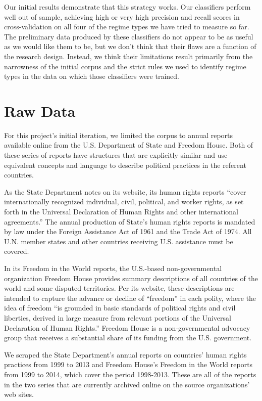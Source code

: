 \documentclass[pdftex,12pt,fullpage,oneside]{amsart}
\begin{document}
Our initial results demonstrate that this strategy works. Our classifiers perform well out of sample, achieving high or very high precision and recall scores in cross-validation on all four of the regime types we have tried to measure so far. The preliminary data produced by these classifiers do not appear to be as useful as we would like them to be, but we don't think that their flaws are a function of the research design. Instead, we think their limitations result primarily from the narrowness of the initial corpus and the strict rules we used to identify regime types in the data on which those classifiers were trained.

\section{Raw Data}

For this project's initial iteration, we limited the corpus to annual reports available online from the U.S. Department of State and Freedom House. Both of these series of reports have structures that are explicitly similar and use equivalent concepts and language to describe political practices in the referent countries.

As the State Department notes on its website, its human rights reports ``cover internationally recognized individual, civil, political, and worker rights, as set forth in the Universal Declaration of Human Rights and other international agreements.'' The annual production of State's human rights reports is mandated by law under the Foreign Assistance Act of 1961 and the Trade Act of 1974. All U.N. member states and other countries receiving U.S. assistance must be covered.

In its Freedom in the World reports, the U.S.-based non-governmental organization Freedom House provides summary descriptions of all countries of the world and some disputed territories. Per its website, these descriptions are intended to capture the advance or decline of ``freedom'' in each polity, where the idea of freedom ``is grounded in basic standards of political rights and civil liberties, derived in large measure from relevant portions of the Universal Declaration of Human Rights.'' Freedom House is a non-governmental advocacy group that receives a substantial share of its funding from the U.S. government.

We scraped the State Department's annual reports on countries' human rights practices from 1999 to 2013 and Freedom House's Freedom in the World reports from 1999 to 2014, which cover the period 1998-2013. These are all of the reports in the two series that are currently archived online on the source organizations' web sites.
\end{document}
